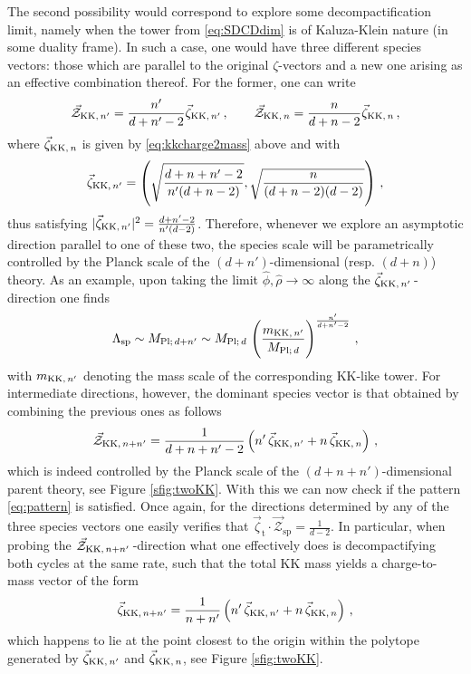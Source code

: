 The second possibility would correspond to explore some decompactification limit, namely when the tower from \eqref{eq:SDCDdim} is of Kaluza-Klein nature (in some duality frame). In such a case, one would have three different species vectors: those which are parallel to the original $\zeta$-vectors and a new one arising as an effective combination thereof. For the former, one can write 
%
\begin{equation}\label{eq:Zvectorgeneral}
	\vec{\mathcal{Z}}_{{\rm KK},\, n'}=\frac{n'}{d+n'-2}\vec{\zeta}_{{\rm KK},\, n'}\, , \qquad \vec{\mathcal{Z}}_{{\rm KK},\, n}=\frac{n}{d+n-2}\vec{\zeta}_{{\rm KK},\, n}\, ,
\end{equation}
%
where $\vec{\zeta}_{{\rm KK},\, n}$ is given by \eqref{eq:kkcharge2mass} above and with
%
\begin{equation}
	\vec{\zeta}_{{\rm KK},\, n'} = \left( \sqrt{\frac{d+n+n'-2}{n' (d+n-2)}} , \sqrt{\frac{n}{(d+n-2)(d-2)}} \right)\, ,
\end{equation}
%
thus satisfying $|\vec{\zeta}_{{\rm KK},\, n'}|^2=\frac{d+n'-2}{n' (d-2)}$. Therefore, whenever we explore an asymptotic direction parallel to one of these two, the species scale will be parametrically controlled by the Planck scale of the $(d+n')$-dimensional (resp. $(d+n)$) theory. As an example, upon taking the limit $\hat\phi, \hat\rho \to \infty$ along the $\vec{\zeta}_{{\rm KK},\, n'}$\,-direction one finds
%
\begin{align} \label{eq:kkspeciesvector}
	\Lambda_{\text{sp}} \sim M_{{\rm Pl};\, d+n'}\sim M_{\text{Pl};\, d}\, \left(\frac{m_{{\rm KK},\, n'}}{M_{\text{Pl};\, d}}\right)^{\frac{n'}{d+n'-2}}\, ,
\end{align}
%
with $m_{{\rm KK},\, n'}$ denoting the mass scale of the corresponding KK-like tower. For intermediate directions, however, the dominant species vector is that obtained by combining the previous ones as follows
%
\begin{equation}\label{eq:effectiveKKspeciesvector}
	\vec{\mathcal{Z}}_{{\rm KK},\, n+n'} = \frac{1}{d+n+n'-2}\left( n'\, \vec{\zeta}_{{\rm KK},\, n'} + n\, \vec{\zeta}_{{\rm KK},\, n}  \right)\, ,
\end{equation}
%
which is indeed controlled by the Planck scale of the $(d+n+n')$-dimensional parent theory, see Figure \ref{sfig:twoKK}. With this we can now check if the pattern \eqref{eq:pattern} is satisfied. Once again, for the directions determined by any of the three species vectors one easily verifies that $\vec{\zeta}_{\text{t}} \cdot \vec{\mathcal{Z}}_{\text{sp}}=\frac{1}{d-2}$. In particular, when probing the $\vec{\mathcal{Z}}_{{\rm KK},\, n+n'}\,$-direction what one effectively does is decompactifying both cycles at the same rate, such that the total KK mass yields a charge-to-mass vector of the form
%
\begin{equation} \label{eq:effectivezeta}
	\vec{\zeta}_{{\rm KK},\, n+n'} = \frac{1}{n+n'}\left( n'\, \vec{\zeta}_{{\rm KK},\, n'} + n\, \vec{\zeta}_{{\rm KK},\, n}  \right)\, ,
\end{equation}
%
which happens to lie at the point closest to the origin within the polytope generated by $\vec{\zeta}_{{\rm KK},\, n'}$ and $\vec{\zeta}_{{\rm KK},\, n}$, see Figure \ref{sfig:twoKK}.
	
